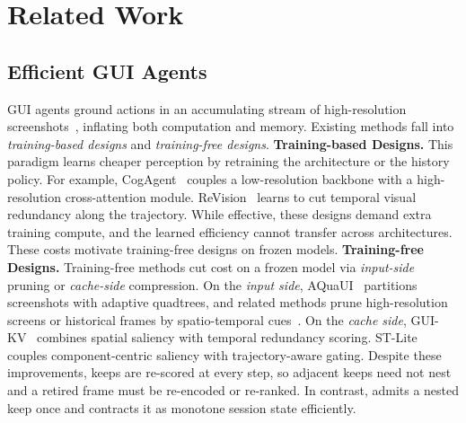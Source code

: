\section{Related Work}
\label{sec:related}
\subsection{Efficient GUI Agents}
GUI agents ground actions in an accumulating stream of high-resolution screenshots~\citep{hong2024cogagent,guiowl2025}, inflating both computation and memory.
%
Existing methods fall into \textit{training-based designs} and \textit{training-free designs}.
%
\textbf{Training-based Designs.}
This paradigm learns cheaper perception by retraining the architecture or the history policy.
%
For example, CogAgent~\citep{hong2024cogagent} couples a low-resolution backbone with a high-resolution cross-attention module.
%
ReVision~\citep{abaskohi2026revision} learns to cut temporal visual redundancy along the trajectory.
%
While effective, these designs demand extra training compute, and the learned efficiency cannot transfer across architectures.
%
These costs motivate training-free designs on frozen models.
%
\textbf{Training-free Designs.}
Training-free methods cut cost on a frozen model via \textit{input-side} pruning or \textit{cache-side} compression.
%
On the \textit{input side}, AQuaUI~\citep{li2026aquaui} partitions screenshots with adaptive quadtrees, and related methods prune high-resolution screens or historical frames by spatio-temporal cues~\citep{xu2026guipruner,histprune2026}.
%
On the \textit{cache side}, GUI-KV~\citep{huang2025guikv} combines spatial saliency with temporal redundancy scoring.
%
ST-Lite~\citep{zhou2026stlite} couples component-centric saliency with trajectory-aware gating.
%
Despite these improvements, keeps are re-scored at every step, so adjacent keeps need not nest and a retired frame must be re-encoded or re-ranked.
%
In contrast, \method{} admits a nested keep once and contracts it as monotone session state efficiently.
